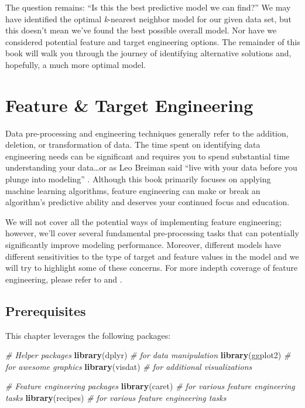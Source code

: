 \documentclass[]{krantz}
\makeatletter
\newenvironment{Shaded}{\begin{snugshade}}{\end{snugshade}}
\newcommand{\CommentTok}[1]{\textcolor[rgb]{0.37,0.37,0.37}{\textit{#1}}}
\newcommand{\KeywordTok}[1]{\textcolor[rgb]{0.27,0.27,0.27}{\textbf{#1}}}
\newcommand{\NormalTok}[1]{#1}
\newenvironment{kframe}{%
\medskip{}
\setlength{\fboxsep}{.8em}
 \def\at@end@of@kframe{}%
 \ifinner\ifhmode%
  \def\at@end@of@kframe{\end{minipage}}%
  \begin{minipage}{\columnwidth}%
 \fi\fi%
 \def\FrameCommand##1{\hskip\@totalleftmargin \hskip-\fboxsep
 \colorbox{shadecolor}{##1}\hskip-\fboxsep
     \hskip-\linewidth \hskip-\@totalleftmargin \hskip\columnwidth}%
 \MakeFramed {\advance\hsize-\width
   \@totalleftmargin\z@ \linewidth\hsize
   \@setminipage}}%
 {\par\unskip\endMakeFramed%
 \at@end@of@kframe}
\renewenvironment{Shaded}{\begin{kframe}}{\end{kframe}}
\makeatother
\begin{document}
The question remains: ``Is this the best predictive model we can find?'' We may have identified the optimal \emph{k}-nearest neighbor model for our given data set, but this doesn't mean we've found the best possible overall model. Nor have we considered potential feature and target engineering options. The remainder of this book will walk you through the journey of identifying alternative solutions and, hopefully, a much more optimal model.

\hypertarget{engineering}{%
\chapter{Feature \& Target Engineering}\label{engineering}}

Data pre-processing and engineering techniques generally refer to the addition, deletion, or transformation of data. The time spent on identifying data engineering needs can be significant and requires you to spend substantial time understanding your data\ldots{}or as Leo Breiman said ``live with your data before you plunge into modeling'' \citep[ p.~201]{breiman2001statistical}. Although this book primarily focuses on applying machine learning algorithms, feature engineering can make or break an algorithm's predictive ability and deserves your continued focus and education.

We will not cover all the potential ways of implementing feature engineering; however, we'll cover several fundamental pre-processing tasks that can potentially significantly improve modeling performance. Moreover, different models have different sensitivities to the type of target and feature values in the model and we will try to highlight some of these concerns. For more indepth coverage of feature engineering, please refer to \citet{kuhn2019feature} and \citet{zheng2018feature}.

\hypertarget{prerequisites-1}{%
\section{Prerequisites}\label{prerequisites-1}}

This chapter leverages the following packages:

\begin{Shaded}
\begin{Highlighting}[]
\CommentTok{# Helper packages}
\KeywordTok{library}\NormalTok{(dplyr)    }\CommentTok{# for data manipulation}
\KeywordTok{library}\NormalTok{(ggplot2)  }\CommentTok{# for awesome graphics}
\KeywordTok{library}\NormalTok{(visdat)   }\CommentTok{# for additional visualizations}

\CommentTok{# Feature engineering packages}
\KeywordTok{library}\NormalTok{(caret)    }\CommentTok{# for various feature engineering tasks}
\KeywordTok{library}\NormalTok{(recipes)  }\CommentTok{# for various feature engineering tasks}
\end{Highlighting}
\end{Shaded}
\end{document}
